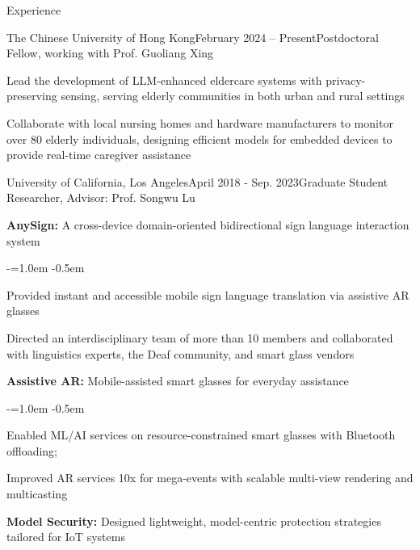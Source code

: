 \documentclass{resume} %
\begin{document}
\begin{rSection}{Experience}

\begin{rSubsection1}{The Chinese University of Hong Kong}{February 2024 -- Present}{Postdoctoral Fellow, working with Prof. Guoliang Xing}{}
\item Lead the development of LLM-enhanced eldercare systems with privacy-preserving sensing, serving elderly communities in both urban and rural settings
\item Collaborate with local nursing homes and hardware manufacturers to monitor over 80 elderly individuals, designing efficient models for embedded devices to provide real-time caregiver assistance
\end{rSubsection1}

\begin{rSubsection11}
{University of California, Los Angeles}{April 2018 - Sep. 2023}{Graduate Student Researcher, Advisor: Prof. Songwu Lu}

\item \textbf{AnySign:} A cross-device domain-oriented bidirectional sign language interaction system
\begin{list}{-}{\leftmargin=1.0em}
\itemsep -0.5em \vspace{-0.5em}
    \item[-] Provided instant and accessible mobile sign language translation via assistive AR glasses
    \item[-] Directed an interdisciplinary team of more than 10 members and collaborated with linguistics experts, the Deaf community, and smart glass vendors
\end{list}

\item \textbf{Assistive AR:} Mobile-assisted smart glasses for everyday assistance
\begin{list}{-}{\leftmargin=1.0em}
\itemsep -0.5em \vspace{-0.5em}
    \item[-] Enabled ML/AI services on resource-constrained smart glasses with Bluetooth offloading;
    \item[-] Improved AR services 10x for mega-events with scalable multi-view rendering and multicasting
\end{list}

\item \textbf{Model Security:} Designed lightweight, model-centric protection strategies tailored for IoT systems


\end{rSubsection11}
\end{rSection}
\end{document}
